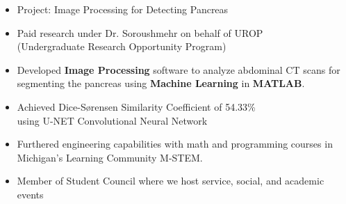\documentclass[10pt,a4paper,ragged2e]{altacv}
\begin{document}
\divider

\begin{itemize}
\item Project: Image Processing for Detecting Pancreas 
\smallskip
\item Paid research under Dr. Soroushmehr on behalf of UROP \\(Undergraduate Research Opportunity Program)
\smallskip
\item Developed \textbf{Image Processing} software to analyze abdominal CT scans for segmenting the pancreas using \textbf{Machine Learning} in \textbf{MATLAB}.
\smallskip
\item Achieved Dice-Sørensen Similarity Coefficient of 54.33\% \\using U-NET Convolutional Neural Network
\end{itemize}

\divider

\begin{itemize}
\item Furthered engineering capabilities with math and programming courses in Michigan's Learning Community M-STEM.
\smallskip
\item Member of Student Council where we host service, social, and academic events
\end{itemize}




\end{document}
